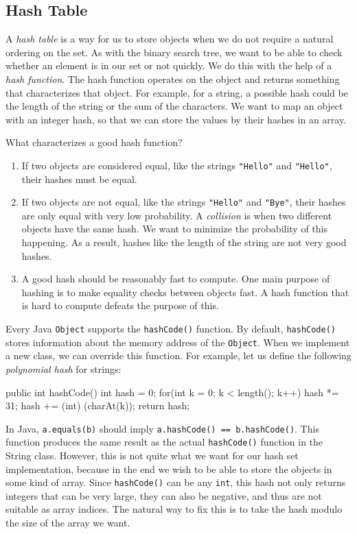 \subsection{Hash Table}

A \textit{hash table} is a way for us to store objects when we do not require a natural ordering on the set. As with the binary search tree, we want to be able to check whether an element is in our set or not quickly. We do this with the help of a \textit{hash function}. The hash function operates on the object and returns something that characterizes that object. For example, for a string, a possible hash could be the length of the string or the sum of the characters. We want to map an object with an integer hash, so that we can store the values by their hashes in an array.

What characterizes a good hash function?

\begin{enumerate}
\item
If two objects are considered equal, like the strings \texttt{"Hello"} and \texttt{"Hello"}, their hashes must be equal.
\item
If two objects are not equal, like the strings \texttt{"Hello"} and \texttt{"Bye"}, their hashes are only equal with very low probability. A \textit{collision} is when two different objects have the same hash. We want to minimize the probability of this happening. As a result, hashes like the length of the string are not very good hashes.
\item
A good hash should be reasonably fast to compute. One main purpose of hashing is to make equality checks between objects fast. A hash function that is hard to compute defeats the purpose of this.
\end{enumerate}

Every Java \texttt{Object} supports the \texttt{hashCode()} function. By default, \texttt{hashCode()} stores information about the memory address of the \texttt{Object}. When we implement a new class, we can override this function. For example, let us define the following \textit{polynomial hash} for strings:

\begin{mylstlisting}
public int hashCode() {
	int hash = 0;
    for(int k = 0; k < length(); k++) {
		hash *= 31;
        hash += (int) (charAt(k));
    }
    return hash;
}
\end{mylstlisting}

In Java, \texttt{a.equals(b)} should imply \texttt{a.hashCode() == b.hashCode()}. This function produces the same result as the actual \texttt{hashCode()} function in the String class. However, this is not quite what we want for our hash set implementation, because in the end we wish to be able to store the objects in some kind of array. Since \texttt{hashCode()} can be any \texttt{int}, this hash not only returns integers that can be very large, they can also be negative, and thus are not suitable as array indices. The natural way to fix this is to take the hash modulo the size of the array we want.

